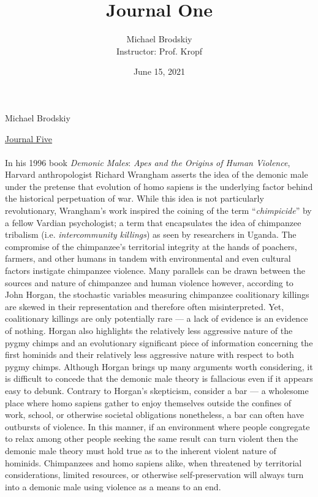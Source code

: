 \documentclass[12pt]{article}
\title{Journal One}
\date{June 15, 2021}
\author{Michael Brodskiy\\ \small Instructor: Prof. Kropf}
\begin{document}
\flushleft Michael Brodskiy

\begin{center}

 \underline{Journal Five}

\end{center}

\begin{justify}
  \paragraph{} In his 1996 book \emph{Demonic Males}: \emph{Apes and the Origins of Human Violence}, Harvard anthropologist Richard Wrangham asserts the idea of the demonic male under the pretense that evolution of homo sapiens is the underlying factor behind the historical perpetuation of war. While this idea is not particularly revolutionary, Wrangham's work inspired the coining of the term “\emph{chimpicide}” by a fellow Vardian psychologist; a term that encapsulates the idea of chimpanzee tribalism (i.e. \emph{intercommunity killings}) as seen by researchers in Uganda. The compromise of the chimpanzee's territorial integrity at the hands of poachers, farmers, and other humans in tandem with environmental and even cultural factors instigate chimpanzee violence. Many parallels can be drawn between the sources and nature of chimpanzee and human violence however, according to John Horgan, the stochastic variables measuring chimpanzee coalitionary killings are skewed in their representation and therefore often misinterpreted. Yet, coalitionary killings are only potentially rare — a lack of evidence is an evidence of nothing. Horgan also highlights the relatively less aggressive nature of the pygmy chimps and an evolutionary significant piece of information concerning the first hominids and their relatively less aggressive nature with respect to both pygmy chimps. Although Horgan brings up many arguments worth considering, it is difficult to concede that the demonic male theory is fallacious even if it appears easy to debunk. Contrary to Horgan's skepticism, consider a bar — a wholesome place where homo sapiens gather to enjoy themselves outside the confines of work, school, or otherwise societal obligations nonetheless, a bar can often have outbursts of violence. In this manner, if an environment where people congregate to relax among other people seeking the same result can turn violent then the demonic male theory must hold true as to the inherent violent nature of hominids. Chimpanzees and homo sapiens alike, when threatened by territorial considerations, limited resources, or otherwise self-preservation will always turn into a demonic male using violence as a means to an end. 
\end{justify}
\end{document}
